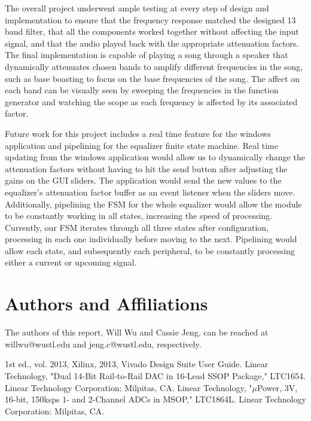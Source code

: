 \documentclass[journal]{IEEEtran} %
\begin{document}
The overall project underwent ample testing at every step of design and implementation to ensure that the frequency response matched the designed 13 band filter, that all the components worked together without affecting the input signal, and that the audio played back with the appropriate attenuation factors. The final implementation is capable of playing a song through a speaker that dynamically attenuates chosen bands to amplify different frequencies in the song, such as base boasting to focus on the base frequencies of the song. The affect on each band can be visually seen by sweeping the frequencies in the function generator and watching the scope as each frequency is affected by its associated factor.

Future work for this project includes a real time feature for the windows application and pipelining for the equalizer finite state machine. Real time updating from the windows application would allow us to dynamically change the attenuation factors without having to hit the send button after adjusting the gains on the GUI sliders. The application would send the new values to the equalizer's attenuation factor buffer as an event listener when the sliders move. Additionally, pipelining the FSM for the whole equalizer would allow the module to be constantly working in all states, increasing the speed of processing. Currently, our FSM iterates through all three states after configuration, processing in each one individually before moving to the next. Pipelining would allow each state, and subsequently each peripheral, to be constantly processing either a current or upcoming signal.

\section*{Authors and Affiliations}\label{sec:authors}
The authors of this report, Will Wu and Cassie Jeng, can be reached at willwu@wustl.edu and jeng.c@wustl.edu, respectively.

\begin{thebibliography}{00}
     1st ed., vol. 2013, Xilinx, 2013, Vivado Design Suite User Guide.
     Linear Technology, "Dual 14-Bit Rail-to-Rail DAC in 16-Lead SSOP Package," LTC1654. Linear Technology Corporation: Milpitas, CA.
     Linear Technology, "$\mu$Power, 3V, 16-bit, 150ksps 1- and 2-Channel ADCs in MSOP," LTC1864L. Linear Technology Corporation: Milpitas, CA.
\end{thebibliography}
\end{document}

